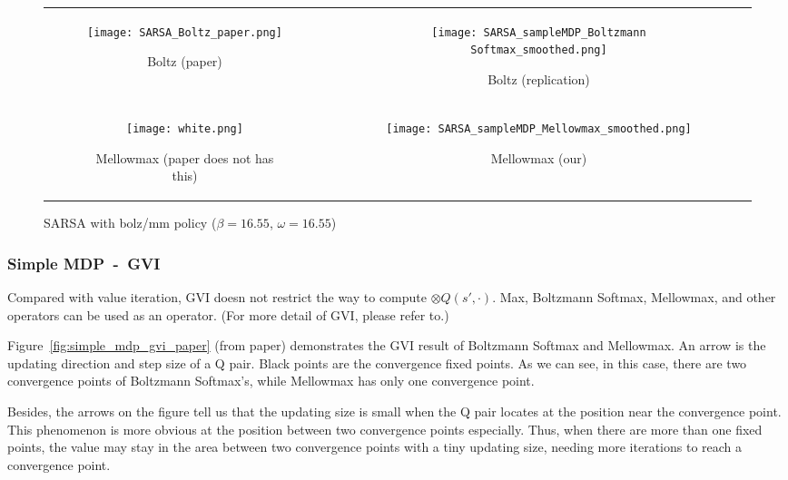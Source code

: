 {\centering
\begin{figure}[H]
\begin{tabular}{cc}
\begin{subfigure}{0.45\textwidth}\centering\texttt{[image: SARSA\_Boltz\_paper.png]}\caption{Boltz (paper)}\end{subfigure}&
\begin{subfigure}{0.45\textwidth}\centering\texttt{[image: SARSA\_sampleMDP\_Boltzmann Softmax\_smoothed.png]}\caption{Boltz (replication)}\end{subfigure}\\
\newline
\begin{subfigure}{0.45\textwidth}\centering\texttt{[image: white.png]}\caption{Mellowmax (paper does not has this)}\end{subfigure}&
\begin{subfigure}{0.45\textwidth}\centering\texttt{[image: SARSA\_sampleMDP\_Mellowmax\_smoothed.png]}\caption{Mellowmax (our)}\end{subfigure}\\
\end{tabular}
\caption{SARSA with bolz/mm policy ($\beta=16.55$, $\omega=16.55$)}\label{fig:simple_mdp_sarsa}
\end{figure}}

\subsubsection{Simple MDP\ -\ GVI}

Compared with value iteration, GVI doesn not restrict the way to compute 
$\otimes Q(s',\cdot)$. Max, Boltzmann Softmax, Mellowmax, and other operators can be used as an operator.
(For more detail of GVI, please refer to\cite{littman1996generalized}.)

Figure\ \ref{fig:simple_mdp_gvi_paper} (from paper) demonstrates the GVI result of
Boltzmann Softmax and Mellowmax. An arrow is the updating direction and step size of a Q pair.
Black points are the convergence fixed points. As we can see, in this case, there are two convergence points of Boltzmann Softmax's,
while Mellowmax has only one convergence point. 

Besides, the arrows on the figure tell us that the updating size is small 
when the Q pair locates at the position near the convergence point.
This phenomenon is more obvious at the position between two convergence points especially.
Thus, when there are more than one fixed points, 
the value may stay in the area between two convergence points with a tiny updating size, 
needing more iterations to reach a convergence point.

